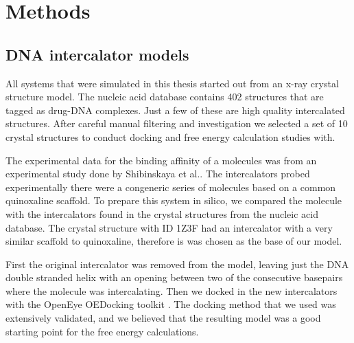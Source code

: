 \section{Methods}

\subsection{DNA intercalator models}

All systems that were simulated in this thesis started out from an x-ray crystal structure model. The nucleic acid database \cite{berman1992nucleic} contains 402 structures that are tagged as drug-DNA complexes. Just a few of these are high quality intercalated structures. After careful manual filtering and investigation we selected a set of 10 crystal structures to conduct docking and free energy calculation studies with.

The experimental data for the binding affinity of a molecules was from an experimental study done by Shibinskaya et al.\cite{shibinskaya2011synthesis}. The intercalators probed experimentally there were a congeneric series of molecules based on a common quinoxaline scaffold. To prepare this system in silico, we compared the molecule with the intercalators found in the crystal structures from the nucleic acid database. The crystal structure with ID 1Z3F had an intercalator with a very similar scaffold to quinoxaline, therefore is was chosen as the base of our model.

First the original intercalator was removed from the model, leaving just the DNA double stranded helix with an opening between two of the consecutive basepairs where the molecule was intercalating. Then we docked in the new intercalators with the OpenEye OEDocking toolkit \cite{kelley2015posit}. The docking method that we used was extensively validated, and we believed that the resulting model was a good starting point for the free energy calculations.    

